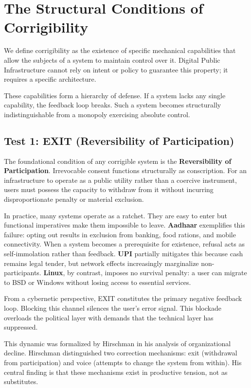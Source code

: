 \section{The Structural Conditions of Corrigibility}
\label{sec:tests}

We define corrigibility as the existence of specific mechanical capabilities that allow the subjects of a system to maintain control over it. Digital Public Infrastructure cannot rely on intent or policy to guarantee this property; it requires a specific architecture.

These capabilities form a hierarchy of defense. If a system lacks any single capability, the feedback loop breaks. Such a system becomes structurally indistinguishable from a monopoly exercising absolute control.

\subsection{Test 1: EXIT (Reversibility of Participation)}

The foundational condition of any corrigible system is the \textbf{Reversibility of Participation}. Irrevocable consent functions structurally as conscription. For an infrastructure to operate as a public utility rather than a coercive instrument, users must possess the capacity to withdraw from it without incurring disproportionate penalty or material exclusion.

In practice, many systems operate as a ratchet. They are easy to enter but functional imperatives make them impossible to leave. \textbf{Aadhaar} exemplifies this failure: opting out results in exclusion from banking, food rations, and mobile connectivity. When a system becomes a prerequisite for existence, refusal acts as self-immolation rather than feedback. \textbf{UPI} partially mitigates this because cash remains legal tender, but network effects increasingly marginalize non-participants. \textbf{Linux}, by contrast, imposes no survival penalty: a user can migrate to BSD or Windows without losing access to essential services.

From a cybernetic perspective, EXIT constitutes the primary negative feedback loop. Blocking this channel silences the user's error signal. This blockade overloads the political layer with demands that the technical layer has suppressed.

This dynamic was formalized by Hirschman \citep{hirschman1970} in his analysis of organizational decline. Hirschman distinguished two correction mechanisms: exit (withdrawal from participation) and voice (attempts to change the system from within). His central finding is that these mechanisms exist in productive tension, not as substitutes.

